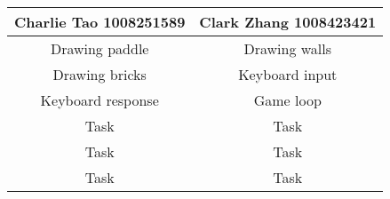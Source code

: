 \documentclass{article}
\begin{document}
\begin{center}
\begin{tabular}{|| c | c ||}
\hline
 Charlie Tao 1008251589 &  Clark Zhang 1008423421 \\ 
 \hline
 Drawing paddle & Drawing walls\\
 \hline
 Drawing bricks & Keyboard input\\
 \hline
 Keyboard response & Game loop\\ 
 \hline
 Task & Task\\ 
 \hline
 Task & Task\\
 \hline
 Task & Task\\  
 \hline
\end{tabular}
\end{center}

\end{document}
